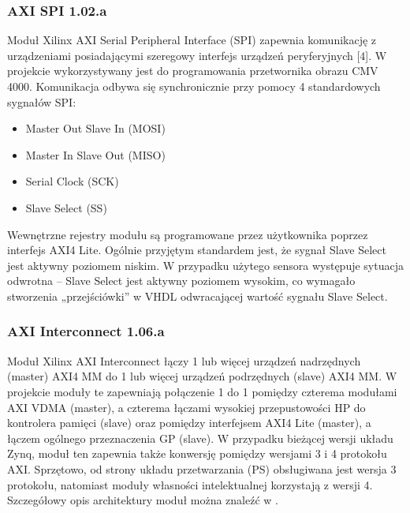 \documentclass[a4paper,11pt,oneside]{book}  %
\begin{document}
\subsubsection{AXI SPI 1.02.a}
Moduł Xilinx AXI Serial Peripheral Interface (SPI) zapewnia komunikację z urządzeniami posiadającymi szeregowy interfejs urządzeń peryferyjnych [4]. W projekcie wykorzystywany jest do programowania przetwornika obrazu CMV 4000. Komunikacja odbywa się synchronicznie przy pomocy 4 standardowych sygnałów SPI:
\begin{itemize}
\item Master Out Slave In (MOSI)
\item Master In Slave Out (MISO)
\item Serial Clock (SCK)
\item Slave Select (SS)
\end{itemize}

Wewnętrzne rejestry modułu są programowane przez użytkownika poprzez interfejs AXI4 Lite. Ogólnie przyjętym standardem jest, że sygnał Slave Select jest aktywny poziomem niskim. W przypadku użytego sensora występuje sytuacja odwrotna – Slave Select jest aktywny poziomem wysokim, co wymagało stworzenia „przejściówki” w VHDL odwracającej wartość sygnału Slave Select.

\subsubsection{AXI Interconnect 1.06.a}
Moduł Xilinx AXI Interconnect łączy 1 lub więcej urządzeń nadrzędnych (master) AXI4 MM do 1 lub więcej urządzeń podrzędnych (slave) AXI4 MM. W projekcie moduły te zapewniają połączenie 1 do 1 pomiędzy czterema modułami AXI VDMA (master), a czterema łączami wysokiej przepustowości HP do kontrolera pamięci (slave) oraz pomiędzy interfejsem AXI4 Lite (master), a łączem ogólnego przeznaczenia GP (slave). W przypadku bieżącej wersji układu Zynq, moduł ten zapewnia także konwersję pomiędzy wersjami 3 i 4 protokołu AXI. Sprzętowo, od strony układu przetwarzania (PS) obsługiwana jest wersja 3 protokołu, natomiast moduły własności intelektualnej korzystają z wersji 4. Szczegółowy opis architektury moduł można znaleźć w \cite{5}.
\end{document}
